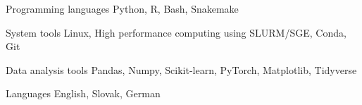 

\begin{cvskills}

  \cvskill
    {Programming languages} %
    {Python, R, Bash, Snakemake} %

  \cvskill
    {System tools} %
    {Linux, High performance computing using SLURM/SGE, Conda, Git} %

  \cvskill
    {Data analysis tools} %
    {Pandas, Numpy, Scikit-learn, PyTorch, Matplotlib, Tidyverse} %

  \cvskill
    {Languages} %
    {English, Slovak, German} %

\end{cvskills}